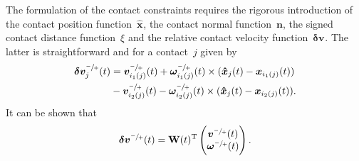 \documentclass[global,twocolumn]{svjour}
\let\vec\bm
\newcommand{\mat}[1]{{\bf #1}}
\newcommand{\dvect}[2]{\ensuremath{\begin{pmatrix}#1\\#2\end{pmatrix}}}
\newcommand{\transp}{{\mathrm{T}}}
\newcommand{\cross}{\times}
\newcommand{\pos}    [1]{\ensuremath{\vec{x}_{#1}}}
\newcommand{\linvel} [1]{\ensuremath{\vec{v}_{#1}}}
\newcommand{\angvel} [1]{\ensuremath{\vec{\omega}_{#1}}}
\newcommand{\relvelWF}[1]{\ensuremath{\vec{\delta v}_{#1}}}
\newcommand{\contactpos}    [1]{\ensuremath{\vec{\hat{x}}_{#1}}}
\begin{document}
		The formulation of the contact constraints requires the
		rigorous introduction of the contact position function~$\contactpos{}$,
		the contact normal function~$\vec n$, the signed contact distance
		function~$\xi$ and the relative contact velocity function~$\relvelWF{}$.
		The latter is straightforward and for a contact~$j$ given by
		\begin{equation*}
			\begin{split}
				\relvelWF{j}^{\sfrac{-}{+}}(t) & = \linvel{i_1(j)}^{\sfrac{-}{+}}(t) + \angvel{i_1(j)}^{\sfrac{-}{+}}(t) \cross (\contactpos{j}(t) - \pos{i_1(j)}(t)) \\
				                               & - \linvel{i_2(j)}^{\sfrac{-}{+}}(t) - \angvel{i_2(j)}^{\sfrac{-}{+}}(t) \cross (\contactpos{j}(t) - \pos{i_2(j)}(t)).
			\end{split}
		\end{equation*}
		It can be shown that
		\begin{equation*}
			\relvelWF{}^{\sfrac{-}{+}}(t) = \mat{W}(t)^\transp \dvect{\linvel{}^{\sfrac{-}{+}}(t)}{\angvel{}^{\sfrac{-}{+}}(t)}.
		\end{equation*}
\end{document}
